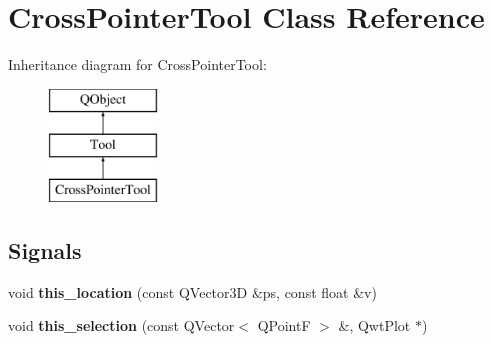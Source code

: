\hypertarget{classCrossPointerTool}{}\section{Cross\+Pointer\+Tool Class Reference}
\label{classCrossPointerTool}
Inheritance diagram for Cross\+Pointer\+Tool\+:\begin{figure}[H]
\begin{center}
\leavevmode
\includegraphics[height=3.000000cm]{classCrossPointerTool}
\end{center}
\end{figure}
\subsection*{Signals}
\begin{DoxyCompactItemize}
\item 
\mbox{\label{classCrossPointerTool_ac59ee8dcb0892aeb22c6eef0316deb86}} 
void {\bfseries this\+\_\+location} (const Q\+Vector3D \&ps, const float \&v)
\item 
\mbox{\label{classTool_a68dea3e4c911f3174176084d350865cc}} 
void {\bfseries this\+\_\+selection} (const Q\+Vector$<$ Q\+PointF $>$ \&, Qwt\+Plot $\ast$)
\end{DoxyCompactItemize}

